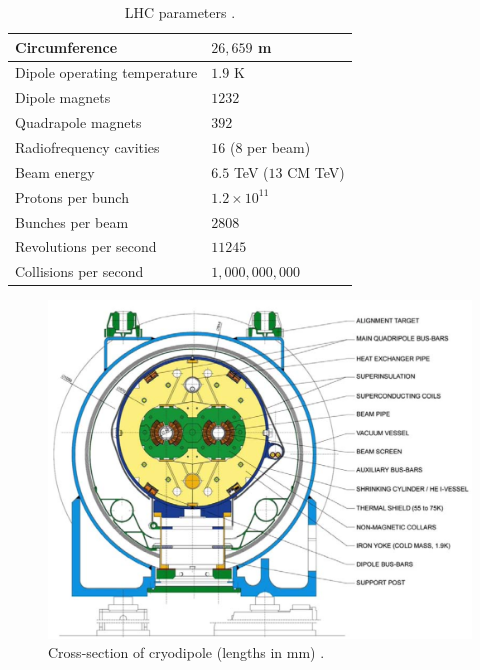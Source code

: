 		\begin{table}[!thp]
			\centering
			\caption{\gls{LHC} parameters  \cite{lhc-facts}.}
			\begin{tabular}{| l | l |}  
			\hline
			Circumference 						& $26,659$ m 					\\ 	\hline
			Dipole operating temperature 		& $1.9$ K 						\\ 	\hline
			Dipole magnets 						& $1232$ 						\\	\hline
			Quadrapole magnets 					& $392$ 						\\	\hline
			Radiofrequency cavities 			& $16$ ($8$ per beam) 			\\ 	\hline
			Beam energy 						& $6.5$ TeV ($13$ CM TeV) 		\\ \hline
			Protons per bunch 					& $1.2 \times 10^{11}$ 			\\ \hline
			Bunches per beam 					& $2808$ 						\\ \hline
			Revolutions per second 				& $11245$ 						\\ \hline
			Collisions per second 				& $1,000,000,000$ 				\\ \hline
			\end{tabular}
			\label{tab:LHC}
		\end{table}

		\begin{figure}[!ht]
		\centering
		\includegraphics[width=\textwidth,keepaspectratio=true]{chapters/chapter3_experiment/images/dipole-crosssection.png}
		\caption{Cross-section of cryodipole (lengths in mm) \cite{lhc-machine}.}
		\label{fig:dipole-xsec}
		\end{figure}

